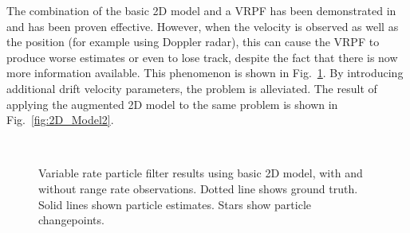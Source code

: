 \documentclass[conference]{IEEEtran}
\begin{document}
The combination of the basic 2D model and a VRPF has been demonstrated in \cite{Godsill2007} and has been proven effective. However, when the velocity is observed as well as the position (for example using Doppler radar), this can cause the VRPF to produce worse estimates or even to lose track, despite the fact that there is now more information available. This phenomenon is shown in Fig.~\ref{fig:2D_Model1}. By introducing additional drift velocity parameters, the problem is alleviated. The result of applying the augmented 2D model to the same problem is shown in Fig.~\ref{fig:2D_Model2}.
%
\begin{figure}[!t]
\centering
{}
\\
\caption{Variable rate particle filter results using basic 2D model, with and without range rate observations. Dotted line shows ground truth. Solid lines shown particle estimates. Stars show particle changepoints.}
\label{fig:2D_Model1}
\end{figure}
\end{document}
